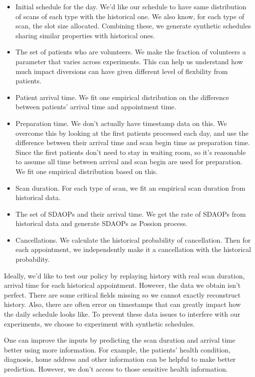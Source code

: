 \begin{itemize}
\item Initial schedule for the day. We'd like our schedule to have
  same distribution of scans of each type with the historical one.
  We also know, for each type of scan, the slot size allocated.
  Combining these, we generate synthetic schedules sharing similar
  properties with historical ones.
\item The set of patients who are volunteers. We make the fraction
  of volunteers a parameter that varies across experiments.
  This can help us understand how much impact diversions can have
  given different level of flexbility from patients.
\item Patient arrival time. We fit one empirical distribution on
  the difference between patients' arrival time and appointment time.
\item Preparation time. We don't actually have timestamp data on this.
  We overcome this by looking at the first patients processed each day,
  and use the difference between their arrival time and scan begin time
  as preparation time. Since the first patients don't need to stay in
  waiting room, so it's reasonable to assume all time between arrival
  and scan begin are used for preparation. We fit one empirical distribution
  based on this.
\item Scan duration. For each type of scan, we fit an empirical
  scan duration from historical data.
\item The set of SDAOPs and their arrival time. We get the rate of
  SDAOPs from historical data and generate SDAOPs as Possion process.
\item Cancellations. We calculate the historical probability of cancellation.
  Then for each appointment, we independently make it a cancellation with
  the historical probability.
\end{itemize}
Ideally, we'd like to test our policy by replaying history with real
scan duration, arrival time for each historical appointment. However,
the data we obtain isn't perfect. There are some critical fields missing
so we cannot exactly reconstruct history. Also, there are often
error on timestamps that can greatly impact how the daily schedule looks like.
To prevent these data issues to interfere with our experiments, we choose
to experiment with synthetic schedules.

One can improve the inputs by predicting the scan duration and
arrival time better using more information. For example, the patients'
health condition, diagnosis, home address and other information can be
helpful to make better prediction. However, we don't access to those
sensitive health information.

